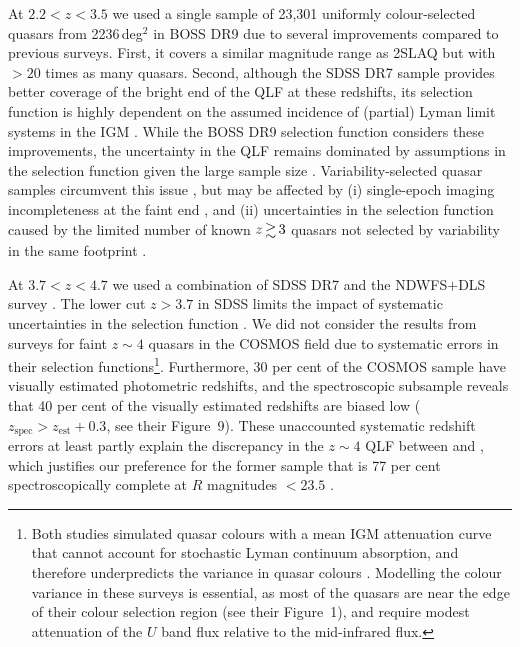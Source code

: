 \documentclass[fleqn,usenatbib]{mnras}
\begin{document}
At $2.2<z<3.5$ we used a single sample of 23,301 uniformly
colour-selected quasars from 2236\,deg$^2$ in BOSS DR9
\citep{2013ApJ...773...14R} due to several improvements compared to
previous surveys. First, it covers a similar magnitude range as 2SLAQ
but with $>20$ times as many quasars. Second, although the SDSS DR7
sample provides better coverage of the bright end of the QLF at these
redshifts, its selection function is highly dependent on the assumed
incidence of (partial) Lyman limit systems in the IGM
\citep{2009ApJ...705L.113P, 2011ApJ...728...23W}. While the BOSS DR9
selection function considers these improvements, the uncertainty in
the QLF remains dominated by assumptions in the selection function
given the large sample size
\citep{2013ApJ...773...14R}. Variability-selected quasar samples
circumvent this issue \citep{2013ApJ...773...14R, 2013A&A...551A..29P,
  2016A&A...587A..41P}, but may be affected by (i) single-epoch
imaging incompleteness at the faint end \citep{2013ApJ...773...14R},
and (ii) uncertainties in the selection function caused by the limited
number of known $z\ga 3$ quasars not selected by variability in the
same footprint \citep{2013A&A...551A..29P, 2016A&A...587A..41P}.

At $3.7<z<4.7$ we used a combination of SDSS DR7 \citep[1785 uniformly
  selected quasars from][]{2010AJ....139.2360S} and the NDWFS$+$DLS
survey \citep{2010ApJ...710.1498G,2011ApJ...728L..26G}. The lower cut
$z>3.7$ in SDSS limits the impact of systematic uncertainties in the
\citet{2006AJ....131.2766R} selection function
\citep{2009ApJ...705L.113P, 2011ApJ...728...23W}. We did not consider
the results from surveys for faint $z\sim 4$ quasars in the COSMOS
field \citep{2011ApJ...728L..25I, 2012ApJ...755..169M} due to
systematic errors in their selection functions\footnote{Both studies
  simulated quasar colours with a mean IGM attenuation curve
  \citep{1995ApJ...441...18M} that cannot account for stochastic Lyman
  continuum absorption, and therefore underpredicts the variance in
  quasar colours \citep{1999ApJ...518..103B, 2008MNRAS.387.1681I,
    2011ApJ...728...23W}. Modelling the colour variance in these
  surveys is essential, as most of the \citet{2011ApJ...728L..25I}
  quasars are near the edge of their colour selection region (see
  their Figure~1), and \citet{2012ApJ...755..169M} require modest
  attenuation of the $U$ band flux relative to the mid-infrared
  flux.}. Furthermore, 30 per cent of the \citet{2012ApJ...755..169M}
COSMOS sample have visually estimated photometric redshifts, and the
spectroscopic subsample reveals that 40 per cent of the visually
estimated redshifts are biased low
($z_\mathrm{spec}>z_\mathrm{est}+0.3$, see their Figure~9). These
unaccounted systematic redshift errors at least partly explain the
discrepancy in the $z\sim 4$ QLF between \citet{2011ApJ...728L..26G}
and \citet{2012ApJ...755..169M}, which justifies our preference for
the former sample that is 77 per cent spectroscopically complete at
$R$ magnitudes $<23.5$ \citep{2011ApJ...728L..26G}.
\end{document}
